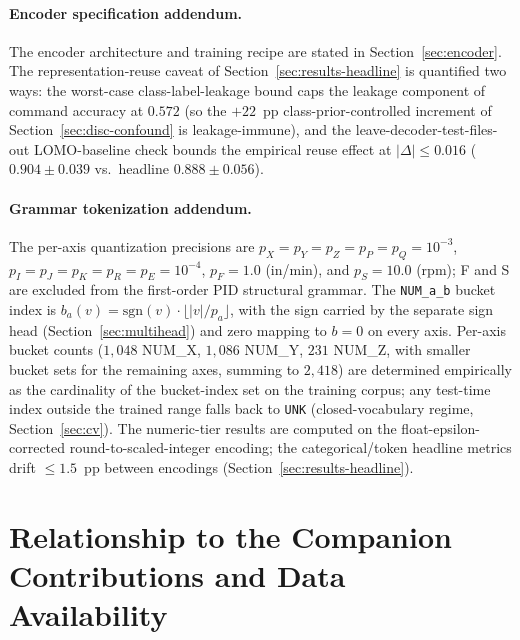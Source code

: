\documentclass[sensors,article,submit,moreauthors,pdftex]{Definitions/mdpi}
\begin{document}
\paragraph{Encoder specification addendum.} The encoder architecture and training recipe are stated in Section~\ref{sec:encoder}. The representation-reuse caveat of Section~\ref{sec:results-headline} is quantified two ways: the worst-case class-label-leakage bound caps the leakage component of command accuracy at $0.572$ (so the $+22$~pp class-prior-controlled increment of Section~\ref{sec:disc-confound} is leakage-immune), and the leave-decoder-test-files-out LOMO-baseline check bounds the empirical reuse effect at $|\Delta|\!\le\!0.016$ ($0.904 \pm 0.039$ vs.\ headline $0.888 \pm 0.056$).

\paragraph{Grammar tokenization addendum.} The per-axis quantization precisions are $p_X\!=\!p_Y\!=\!p_Z\!=\!p_P\!=\!p_Q\!=\!10^{-3}$, $p_I\!=\!p_J\!=\!p_K\!=\!p_R\!=\!p_E\!=\!10^{-4}$, $p_F\!=\!1.0$ (in/min), and $p_S\!=\!10.0$ (rpm); F and S are excluded from the first-order PID structural grammar. The \texttt{NUM\_a\_b} bucket index is $b_a(v) = \mathrm{sgn}(v)\cdot\lfloor |v|/p_a \rfloor$, with the sign carried by the separate sign head (Section~\ref{sec:multihead}) and zero mapping to $b\!=\!0$ on every axis. Per-axis bucket counts ($1{,}048$ NUM\_X, $1{,}086$ NUM\_Y, $231$ NUM\_Z, with smaller bucket sets for the remaining axes, summing to $2{,}418$) are determined empirically as the cardinality of the bucket-index set on the training corpus; any test-time index outside the trained range falls back to \texttt{UNK} (closed-vocabulary regime, Section~\ref{sec:cv}). The numeric-tier results are computed on the float-epsilon-corrected round-to-scaled-integer encoding; the categorical/token headline metrics drift $\le\!1.5$~pp between encodings (Section~\ref{sec:results-headline}).


\section{Relationship to the Companion Contributions and Data Availability}
\label{app:companion}
\end{document}
